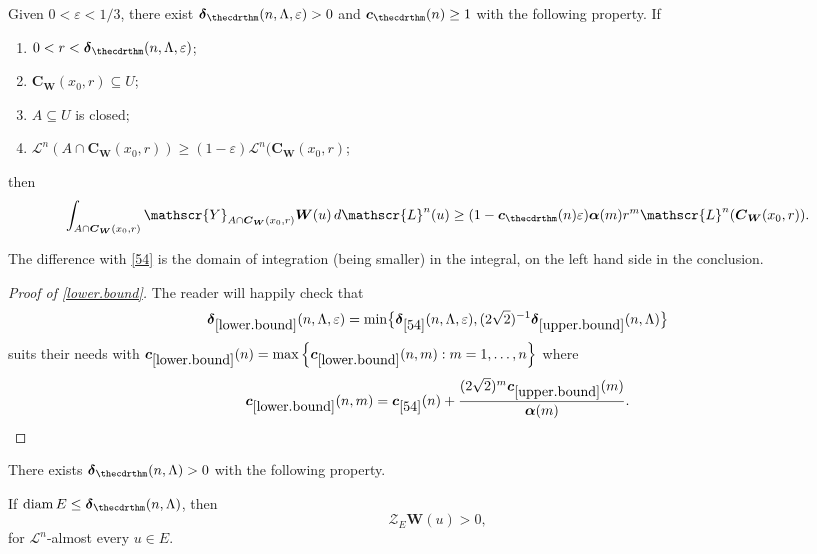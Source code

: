 \documentclass[JEP,XML,SOM,Unicode,ThmDefs,NoEqCountersInSection]{cedram}
\newcommand{\calL}{\mathscr{L}}
\newcommand{\calY}{\mathscr{Y}}
\newcommand{\calZ}{\mathscr{Z}}
\newcommand{\balpha}{\boldsymbol{\alpha}}
\newcommand{\bdelta}{\boldsymbol{\delta}}
\newcommand{\bC}{{\boldsymbol{C}}}
\newcommand{\bW}{{\boldsymbol{W}}}
\newcommand{\bc}{{\boldsymbol{c}}}
\DeclareMathOperator{\rmdiam}{\mathrm{diam}}
\let\veps\varepsilon
\let\subset\subseteq
\begin{document}
\begin{Proposition}
\label{lower.bound}
Given $0 < \veps < 1/3$, there exist $\bdelta_{\thecdrthm}(n,\Lambda,\veps)>0$ and $\bc_{\thecdrthm}(n) \geq 1$ with the following property. If
\begin{enumerate}
\item $0 < r < \bdelta_{\thecdrthm}(n,\Lambda,\veps)$;
\item $\bC_\bW(x_0,r) \subset U$;
\item $A \subset U$ is closed;
\item $\calL^n \left(A \cap \bC_\bW(x_0,r) \right) \geq (1 - \veps) \calL^n (\bC_\bW(x_0,r)$;
\end{enumerate}
then
\begin{equation*}
\int_{A \cap \bC_\bW(x_0,r)} \calY_{A \cap \bC_\bW(x_0,r)} \bW (u) \,d\calL^n(u) \geq (1 - \bc_{\thecdrthm}(n) \veps) \balpha(m)r^m\calL^n(\bC_\bW(x_0,r)).
\end{equation*}
\end{Proposition}

\begin{Remark}
The difference with \ref{54} is the domain of integration (being smaller) in the integral, on the left hand side in the conclusion.
\end{Remark}

\begin{proof}[Proof of \ref{lower.bound}]
The reader will happily check that
\begin{equation*}
\bdelta_{\ref{lower.bound}}(n,\Lambda,\veps) = \min \bigl\{\bdelta_{\ref{54}}(n,\Lambda,\veps),(2\sqrt{2})^{-1} \bdelta_{\ref{upper.bound}}(n,\Lambda)\bigr\}
\end{equation*}
suits their needs with $\bc_{\ref{lower.bound}}(n) = \max \left\{ \bc_{\ref{lower.bound}}(n,m): m=1,\ldots,n \right\}$ where
\begin{equation*}
\bc_{\ref{lower.bound}}(n,m) = \bc_{\ref{54}}(n) + \frac{(2 \sqrt{2})^m\bc_{\ref{upper.bound}}(m)}{\balpha(m)}.\qedhere
\end{equation*}
\end{proof}

\begin{proposition}
\label{Z.positive}
There exists $\bdelta_{\thecdrthm}(n,\Lambda) > 0$ with the following property.

If $\rmdiam E \leq \bdelta_{\thecdrthm}(n,\Lambda)$, then
\begin{equation*}
\calZ_E \bW(u) > 0,
\end{equation*}
for $\calL^n$-almost every $u \in E$.
\end{proposition}
\end{document}
